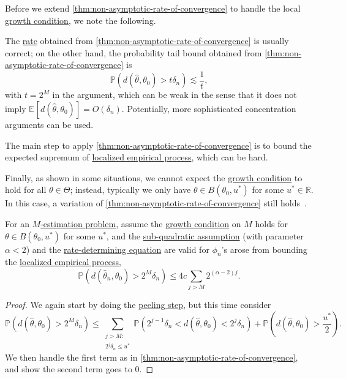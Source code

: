 Before we extend \autoref{thm:non-asymptotic-rate-of-convergence} to handle the local \hyperref[def:growth-condition*]{growth condition}, we note the following.

\begin{remark}
	The \hyperref[def:rate-of-convergence]{rate} obtained from \autoref{thm:non-asymptotic-rate-of-convergence} is usually correct; on the other hand, the probability tail bound obtained from \autoref{thm:non-asymptotic-rate-of-convergence} is
	\[
		\mathbb{P} (d(\hat{\theta} , \theta _0) > t \delta _n) \lesssim \frac{1}{t},
	\]
	with \(t = 2^M\) in the argument, which can be weak in the sense that it does not imply \(\mathbb{E}_{}[d(\hat{\theta} , \theta _0) ] = O(\delta _n)\). Potentially, more sophisticated concentration arguments can be used.
\end{remark}

\begin{remark}
	The main step  to apply \autoref{thm:non-asymptotic-rate-of-convergence} is to bound the expected supremum of \hyperref[def:localized-EP]{localized empirical process}, which can be hard.
\end{remark}

Finally, as shown in some situations, we cannot expect the \hyperref[def:growth-condition*]{growth condition} to hold for all \(\theta \in \Theta \); instead, typically we only have \(\theta \in B(\theta _0, u^{\ast} )\) for some \(u^{\ast} \in \mathbb{R} \). In this case, a variation of \autoref{thm:non-asymptotic-rate-of-convergence} still holds~\cite[Theorem 3.2.5]{vandervaartWeakConvergenceEmpirical1996}.

\begin{theorem}\label{thm:non-asymptotic-rate-of-convergence-extend}
	For an \hyperref[prb:M-estimation]{\(M\)-estimation problem}, assume the \hyperref[def:growth-condition*]{growth condition} on \(M\) holds for \(\theta \in B(\theta _0, u^{\ast} )\) for some \(u^{\ast} \), and the \hyperref[def:sub-quadratic-assumption]{sub-quadratic assumption} (with parameter \(\alpha < 2\)) and the \hyperref[def:rate-determining-equation]{rate-determining equation} are valid for \(\phi _n\)'s arose from bounding the \hyperref[def:localized-EP]{localized empirical process},
	\[
		\mathbb{P} (d(\hat{\theta} _n, \theta _0) > 2^M \delta _n) \leq 4c \sum_{j > M} 2^{(\alpha -2) j}.
	\]
\end{theorem}
\begin{proof}
	We again start by doing the \hyperref[eq:peeling-step]{peeling step}, but this time consider
	\[
		\mathbb{P} (d(\hat{\theta} , \theta _0) > 2^M \delta _n)
		\leq \sum_{\substack{j > M\colon \\ 2^j \delta _n \leq u^{\ast} }} \mathbb{P} (2^{j-1} \delta _n < d(\hat{\theta} , \theta _0) < 2^j \delta _n) + \mathbb{P} \left( d(\hat{\theta} , \theta _0) > \frac{u^{\ast} }{2} \right).
	\]
	We then handle the first term as in \autoref{thm:non-asymptotic-rate-of-convergence}, and show the second term goes to \(0\).
\end{proof}

